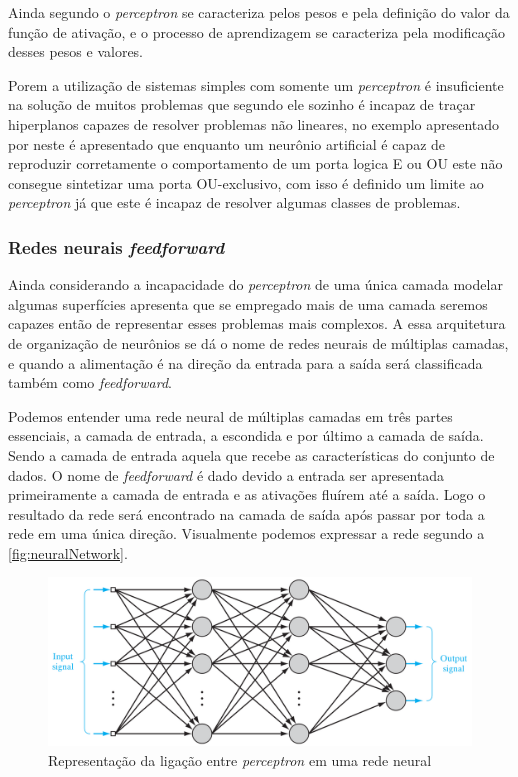 \documentclass[
    12pt,
    oneside,
    a4paper,
    english,
    brazil
]{abntex2}
\begin{document}
Ainda segundo   o  \textit{perceptron} se  caracteriza pelos
pesos  e pela  definição  do valor  da  função  de ativação,  e  o processo  de
aprendizagem se caracteriza pela modificação desses pesos e valores.

Porem a  utilização de  sistemas simples com  somente um  \textit{perceptron} é
insuficiente na solução de muitos problemas que segundo  ele
sozinho  é incapaz  de traçar  hiperplanos  capazes de  resolver problemas  não
lineares, no  exemplo apresentado  por  neste  é apresentado
que  enquanto um  neurônio  artificial  é capaz  de  reproduzir corretamente  o
comportamento de um porta logica E ou OU este não consegue sintetizar uma porta
OU-exclusivo, com isso é definido um limite ao \textit{perceptron} já que este
é incapaz de resolver algumas classes de problemas.

\subsubsection{Redes neurais \textit{feedforward}}

Ainda considerando  a incapacidade do  \textit{perceptron} de uma  única camada
modelar algumas superfícies  apresenta que se empregado mais
de  uma  camada seremos  capazes  então  de  representar esses  problemas  mais
complexos. A essa arquitetura de organização de neurônios se dá o nome de redes
neurais de  múltiplas camadas, e quando  a alimentação é na  direção da entrada
para a saída será classificada também como \textit{feedforward}.

Podemos  entender  uma  rede  neural   de  múltiplas  camadas  em  três  partes
essenciais, a camada  de entrada, a escondida  e por último a  camada de saída.
Sendo a camada  de entrada aquela que recebe as  características do conjunto de
dados. O nome  de \textit{feedforward} é dado devido a  entrada ser apresentada
primeiramente a camada  de entrada e as  ativações fluírem até a  saída. Logo o
resultado da  rede será encontrado  na camada de saída  após passar por  toda a
rede  em uma  única direção.  Visualmente podemos  expressar a  rede segundo  a
\autoref{fig:neuralNetwork}.

\begin{figure}[ht]
    \centering
    \caption{Representação da ligação entre \textit{perceptron} em uma rede
    neural}\label{fig:neuralNetwork}
    \includegraphics[width=.5\linewidth]{images/neuralNetwork.png}
\end{figure}
\end{document}
